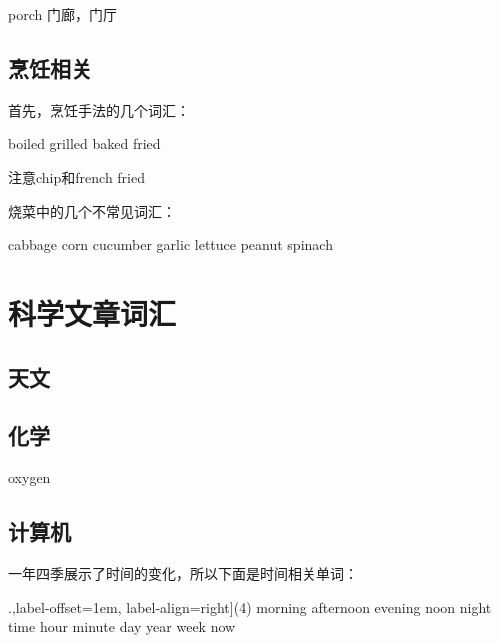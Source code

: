 \documentclass[a4paper]{article}
\begin{document}
\begin{tasks}
  \task porch \task 门廊，门厅
\end{tasks}

  \subsection{烹饪相关}

首先，烹饪手法的几个词汇：

\begin{tasks}
  \task boiled \task grilled \task baked \task fried
\end{tasks}

注意chip和french fried

烧菜中的几个不常见词汇：

\begin{tasks}
  \task cabbage
  \task corn
  \task cucumber
  \task garlic
  \task lettuce
  \task peanut
  \task spinach
\end{tasks}

\section{科学文章词汇}

  \subsection{天文}

  \subsection{化学}
  oxygen
  \subsection{计算机}


一年四季展示了时间的变化，所以下面是时间相关单词：                                 

\begin{tasks}[counter-format=tsk[1].,label-offset=1em, label-align=right](4)
 \task morning  \task afternoon  \task evening \task noon
 \task night    \task time     \task hour       \task minute
 \task day      \task year     \task week       \task now
\end{tasks}
\end{document}
